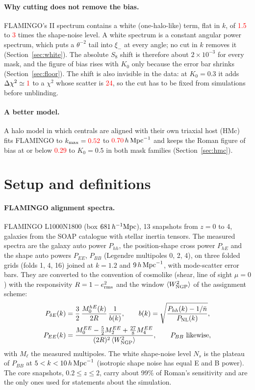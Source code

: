 \documentclass[11pt]{article}
\newcommand{\hMpc}{\,h\,{\rm Mpc}^{-1}}
\newcommand{\kmax}{k_{\rm max}}
\newcommand{\dchi}{\Delta\chi^2}
\newcommand{\PNL}{P_{\rm NL}}
\newcommand{\PdE}{P_{\delta E}}
\newif\ifnumbersfinal
\newcommand{\refresh}[1]{\ifnumbersfinal#1\else\textcolor{red}{#1}\fi}
\newcommand{\WhiteLo}{\refresh{1.5}}
\newcommand{\WhiteHi}{\refresh{3}}
\newcommand{\DetectChi}{\refresh{1}}
\newcommand{\DetectScatter}{\refresh{24}}
\newcommand{\HMcCutLo}{\refresh{0.52}}
\newcommand{\HMcCutHi}{\refresh{0.70}}
\newcommand{\HMcMaxFoB}{\refresh{0.29}}
\begin{document}
\paragraph{Why cutting does not remove the bias.}
FLAMINGO's II spectrum contains a white (one-halo-like) term, flat in
$k$, of \WhiteLo{} to \WhiteHi{} times the shape-noise level. A white
spectrum is a constant angular power spectrum, which puts a
$\theta^{-2}$ tail into $\xi_-$ at every angle; no cut in $k$ removes
it (Section~\ref{sec:white}). The absolute $S_8$ shift is therefore
about $2\times10^{-3}$ for every mask, and the figure of bias rises
with $K_0$ only because the error bar shrinks
(Section~\ref{sec:floor}). The shift is also invisible in the data: at
$K_0 = 0.3$ it adds $\dchi \simeq \DetectChi$ to a $\chi^2$ whose
scatter is \DetectScatter, so the cut has to be fixed from simulations
before unblinding.

\paragraph{A better model.}
A halo model in which centrals are aligned with their own triaxial
host (HMc) fits FLAMINGO to $\kmax = \HMcCutLo$ to $\HMcCutHi\hMpc$
and keeps the Roman figure of bias at or below \HMcMaxFoB{} to $K_0 =
0.5$ in both mask families (Section~\ref{sec:hmc}).

\section{Setup and definitions}
\label{sec:setup}

\paragraph{FLAMINGO alignment spectra.}
FLAMINGO L1000N1800 (box $681\,h^{-1}{\rm Mpc}$), 13 snapshots from
$z = 0$ to 4, galaxies from the SOAP catalogue with stellar inertia
tensors. The measured spectra are the galaxy auto power $P_{hh}$, the
position-shape cross power $P_{hE}$ and the shape auto powers $P_{EE}$,
$P_{BB}$ (Legendre multipoles 0, 2, 4), on three folded grids (folds
1, 4, 16) joined at $k = 1.2$ and $9\hMpc$, with mode-scatter error
bars. They are converted to the convention of cosmolike (shear, line
of sight $\mu = 0$) with the responsivity $R = 1 - e_{\rm rms}^2$ and
the window $\langle W^2_{\rm NGP}\rangle$ of the assignment scheme:
\begin{align}
  \PdE(k) &= \frac{3}{2}\,\frac{M_0^{hE}(k)}{2R}\,\frac{1}{b(k)},
  \qquad b(k) = \sqrt{\frac{P_{hh}(k) - 1/\bar n}{\PNL(k)}},\\
  P_{EE}(k) &= \frac{M_0^{EE} - \tfrac52 M_2^{EE} + \tfrac{27}{8} M_4^{EE}}
  {(2R)^2\,\langle W^2_{\rm NGP}\rangle},\qquad P_{BB}\ \text{likewise},
\end{align}
with $M_\ell$ the measured multipoles. The white shape-noise level
$N_s$ is the plateau of $P_{BB}$ at $5 < k < 10\hMpc$ (isotropic shape
noise has equal E and B power). The core snapshots, $0.2 \le z \le 2$,
carry about 99\% of Roman's sensitivity and are the only ones
used for statements about the simulation.
\end{document}

